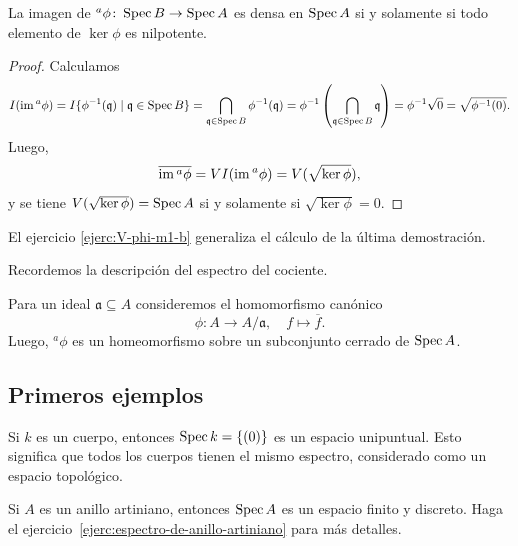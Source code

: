 \documentclass{article}
\numberwithin{equation}{section}
\theoremstyle{definition}
\begin{document}
\begin{proposicion}
  La imagen de ${}^a \phi\colon \operatorname{Spec} B\to \operatorname{Spec} A$ es densa en $\operatorname{Spec} A$ si y
  solamente si todo elemento de $\ker \phi$ es nilpotente.

  \begin{proof}
    Calculamos
    \[ I (\operatorname{im} {}^a \phi) =
       I \{ \phi^{-1} (\mathfrak{q}) \mid \mathfrak{q} \in \operatorname{Spec} B \} =
       \bigcap_{\mathfrak{q} \in \operatorname{Spec} B} \phi^{-1} (\mathfrak{q}) =
       \phi^{-1} \left(\bigcap_{\mathfrak{q} \in \operatorname{Spec} B} \mathfrak{q}\right) =
       \phi^{-1} \sqrt{0} = \sqrt{\phi^{-1} (0)}. \]
    Luego,
    $$\overline{\operatorname{im} {}^a \phi} = VI (\operatorname{im} {}^a \phi) = V (\sqrt{\ker \phi}),$$
    y se tiene $V (\sqrt{\ker \phi}) = \operatorname{Spec} A$ si y solamente si $\sqrt{\ker\phi} = 0$.
  \end{proof}
\end{proposicion}

El ejercicio \ref{ejerc:V-phi-m1-b} generaliza el cálculo de la última
demostración.

Recordemos la descripción del espectro del cociente.

\begin{proposicion}
  Para un ideal $\mathfrak{a} \subseteq A$ consideremos el homomorfismo canónico
  $$\phi\colon A \to A/\mathfrak{a}, \quad f \mapsto \overline{f}.$$
  Luego, ${}^a \phi$ es un homeomorfismo sobre un subconjunto cerrado de
  $\operatorname{Spec} A$.
\end{proposicion}

\subsection{Primeros ejemplos}

\begin{ejemplo}
  Si $k$ es un cuerpo, entonces $\operatorname{Spec} k = \{ (0) \}$ es un espacio
  unipuntual. Esto significa que todos los cuerpos tienen el mismo espectro,
  considerado como un espacio topológico.
\end{ejemplo}

\begin{ejemplo}
  Si $A$ es un anillo artiniano, entonces $\operatorname{Spec} A$ es un espacio finito y
  discreto. Haga el ejercicio~\ref{ejerc:espectro-de-anillo-artiniano} para más
  detalles.
\end{ejemplo}
\end{document}
